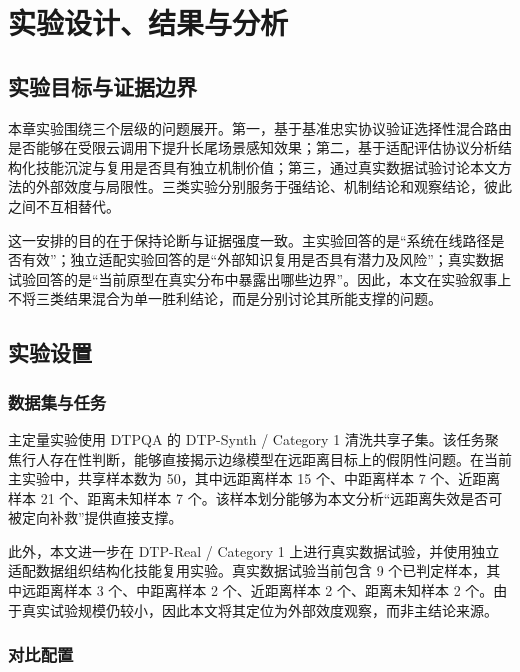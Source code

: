 
\chapter{实验设计、结果与分析}
\label{cha:experiment}

\section{实验目标与证据边界}
\label{sec:exp-goal}

本章实验围绕三个层级的问题展开。第一，基于基准忠实协议验证选择性混合路由是否能够在受限云调用下提升长尾场景感知效果；第二，基于适配评估协议分析结构化技能沉淀与复用是否具有独立机制价值；第三，通过真实数据试验讨论本文方法的外部效度与局限性。三类实验分别服务于强结论、机制结论和观察结论，彼此之间不互相替代。

这一安排的目的在于保持论断与证据强度一致。主实验回答的是“系统在线路径是否有效”；独立适配实验回答的是“外部知识复用是否具有潜力及风险”；真实数据试验回答的是“当前原型在真实分布中暴露出哪些边界”。因此，本文在实验叙事上不将三类结果混合为单一胜利结论，而是分别讨论其所能支撑的问题。

\section{实验设置}
\label{sec:exp-setup}

\subsection{数据集与任务}

主定量实验使用 DTPQA 的 DTP-Synth / Category 1 清洗共享子集。该任务聚焦行人存在性判断，能够直接揭示边缘模型在远距离目标上的假阴性问题\cite{theodoridis2025dtpqa,theodoridis2025evaluating}。在当前主实验中，共享样本数为 50，其中远距离样本 15 个、中距离样本 7 个、近距离样本 21 个、距离未知样本 7 个。该样本划分能够为本文分析“远距离失效是否可被定向补救”提供直接支撑。

此外，本文进一步在 DTP-Real / Category 1 上进行真实数据试验，并使用独立适配数据组织结构化技能复用实验。真实数据试验当前包含 9 个已判定样本，其中远距离样本 3 个、中距离样本 2 个、近距离样本 2 个、距离未知样本 2 个。由于真实试验规模仍较小，因此本文将其定位为外部效度观察，而非主结论来源。

\subsection{对比配置}

